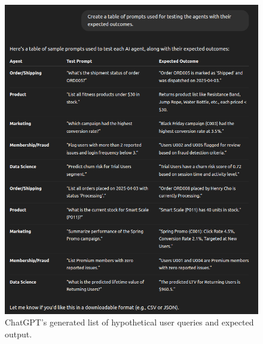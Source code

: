 \documentclass[11pt,letterpaper]{article}
\begin{document}
\begin{figure}[h!]
    \centering
      \includegraphics[width=1.0\linewidth]{chatgpt_11.png}    
      \caption{ChatGPT's generated list of hypothetical user queries and expected output.}
    \label{fig:prompts}
\end{figure}
\end{document}
